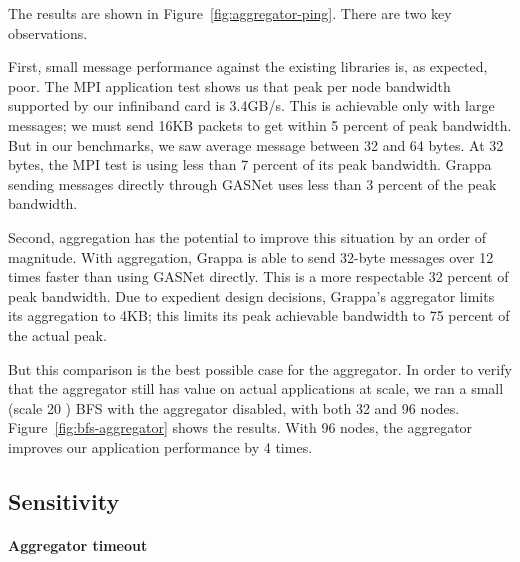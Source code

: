 The results are shown in Figure~\ref{fig:aggregator-ping}. There are
two key observations.

First, small message performance against the existing libraries is, as expected, poor. The MPI application test shows us that peak per node
bandwidth supported by our infiniband card is 3.4GB/s. This is
achievable only with large messages; we must send 16KB packets to get
within 5 percent of peak bandwidth. But in our benchmarks, we saw
average message between 32 and 64 bytes. At 32 bytes, the MPI test is
using less than 7 percent of its peak bandwidth. Grappa sending
messages directly through GASNet uses less than 3 percent of the peak
bandwidth.

Second, aggregation has the potential to improve this situation by an
order of magnitude. With aggregation, Grappa is able to send 32-byte
messages over 12 times faster than using GASNet directly. This is a
more respectable 32 percent of peak bandwidth. Due to expedient design
decisions, Grappa's aggregator limits its aggregation to 4KB; this
limits its peak achievable bandwidth to 75 percent of the actual
peak.

But this comparison is the best possible case for the aggregator. In
order to verify that the aggregator still has value on actual
applications at scale, we ran a small (scale 20 ) BFS
with the aggregator disabled, with both 32 and 96
nodes. Figure~\ref{fig:bfs-aggregator} shows the results. With 96
nodes, the aggregator improves our application performance by 4 times.

\subsection{Sensitivity}

\paragraph{Aggregator timeout}

